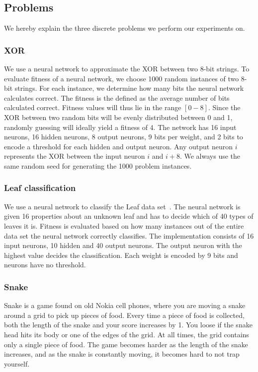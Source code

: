 \subsection{Problems}
We hereby explain the three discrete problems we perform our experiments on.

\subsubsection{XOR}
We use a neural network to approximate the XOR between two 8-bit strings.
To evaluate fitness of a neural network, we choose 1000 random instances of two 8-bit strings.
For each instance, we determine how many bits the neural network calculates correct.
The fitness is the defined as the average number of bits calculated correct.
Fitness values will thus lie in the range $[0-8]$.
Since the XOR between two random bits will be evenly distributed between 0 and 1,
randomly guessing will ideally yield a fitness of 4.
The network has 16 input neurons, 16 hidden neurons, 8 output neurons, 9 bits per weight, and 2 bits to encode a threshold for each hidden and output neuron. Any output neuron $i$ represents the XOR between the input neuron $i$ and $i+8$. 
We always use the same random seed for generating the 1000 problem instances.

\subsubsection{Leaf classification}
We use a neural network to classify the Leaf data set~\cite{Bache+Lichman:2013, leafdataset}.
The neural network is given 16 properties about an unknown leaf and has to decide which of 40 types of leaves it is.
Fitness is evaluated based on how many instances out of the entire data set the neural network correctly classifies.
The implementation consists of 16 input neurons, 10 hidden and 40 output neurons. The output neuron with the highest value decides the classification. Each weight is encoded by 9 bits and neurons have no threshold.

\subsubsection{Snake}
Snake is a game found on old Nokia cell phones, where you are moving a snake around a grid to pick up pieces of food.
Every time a piece of food is collected, both the length of the snake and your score increases by 1.
You loose if the snake head hits its body or one of the edges of the grid.
At all times, the grid contains only a single piece of food.
The game becomes harder as the length of the snake increases, and as the snake is constantly moving, it becomes hard to not trap yourself.

